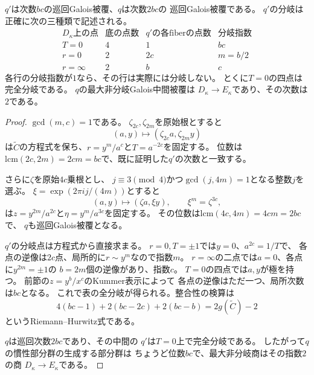\begin{theorem}[巡回分岐と最大非分岐商]
\label{thm:prym-cyclic-inertia}
$q'$は次数$bc$の巡回Galois被覆、$q$は次数$2bc$の
巡回Galois被覆である。
$q'$の分岐は正確に次の三種類で記述される。
\[
\begin{array}{c|c|c|c}
 D_\kappa\text{上の点}&\text{底の点数}&
 q'\text{の各fiberの点数}&\text{分岐指数}\\ \hline
 T=0&4&1&bc\\
 r=0&2&2c&m=b/2\\
 r=\infty&2&b&c
\end{array}
\]
各行の分岐指数が$1$なら、その行は実際には分岐しない。
とくに$T=0$の四点は完全分岐である。
$q$の最大非分岐Galois中間被覆は
$D_\kappa\to E_\kappa$であり、その次数は$2$である。
\end{theorem}
\begin{proof}
$\gcd(m,c)=1$である。
$\zeta_{2c},\zeta_{2m}$を原始根とすると
\[
 (a,y)\longmapsto(\zeta_{2c}a,\zeta_{2m}y)
\]
は$\widetilde C$の方程式を保ち、$r=y^m/a^c$と$T=a^{-2c}$を固定する。
位数は$\mathrm{lcm}(2c,2m)=2cm=bc$で、既に証明した$q'$の次数と一致する。

さらに$\zeta$を原始$4c$乗根とし、
$j\equiv3\pmod4$かつ$\gcd(j,4m)=1$となる整数$j$を選ぶ。
$\xi=\exp(2\pi i j/(4m))$とすると
\[
 (a,y)\longmapsto(\zeta a,\xi y),\qquad
 \xi^m=\zeta^{3c},
\]
は$z=y^{2m}/a^{2c}$と$\eta=y^m/a^{3c}$を固定する。
その位数は$\mathrm{lcm}(4c,4m)=4cm=2bc$で、
$q$も巡回Galois被覆となる。

$q'$の分岐点は方程式から直接求まる。
$r=0,T=\pm1$では$y=0$、$a^{2c}=1/T$で、
各点の逆像は$2c$点、局所的に$r\sim y^m$なので指数$m$。
$r=\infty$の二点では$a=0$、各点に$y^{2m}=\pm1$の
$b=2m$個の逆像があり、指数$c$。
$T=0$の四点では$a,y$が極を持つ。
前節の$z=y^b/x^c$のKummer表示によって
各点の逆像はただ一つ、局所次数は$bc$となる。
これで表の全分岐が得られる。整合性の検算は
\[
 4(bc-1)+2(bc-2c)+2(bc-b)
   =2g(\widetilde C)-2
\]
というRiemann--Hurwitz式である。

$q$は巡回次数$2bc$であり、その中間の
$q'$は$T=0$上で完全分岐である。
したがって$q$の慣性部分群の生成する部分群は
ちょうど位数$bc$で、最大非分岐商はその指数$2$の商
$D_\kappa\to E_\kappa$である。
\end{proof}

